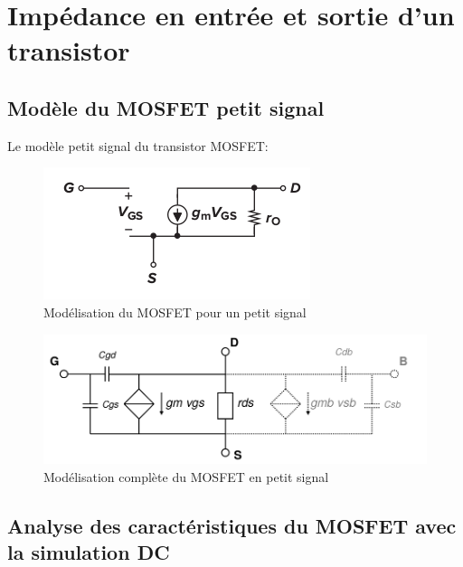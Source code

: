 \documentclass[a4paper]{article}
\begin{document}
\section{Imp\'edance en entr\'ee et sortie d'un transistor}
\subsection{Mod\`ele du MOSFET petit signal}
Le mod\`ele petit signal du transistor MOSFET:

\begin{figure}[!htb]
\begin{center}
  \includegraphics[scale=0.7]{MOS_small_signal.png}
  \caption{Mod\'elisation du MOSFET pour un petit signal\cite{Analog-CMOS-microelectronics} }
\end{center}
\end{figure}

\begin{figure}[!htb]
\begin{center}
  \includegraphics[scale=0.47]{complete-model.png}
  \caption{Mod\'elisation compl\`ete du MOSFET en petit signal\cite{conception-circuits-integrees}}
\end{center}
\end{figure}

\subsection{Analyse des caract\'eristiques du MOSFET avec la simulation DC}

\end{document}
